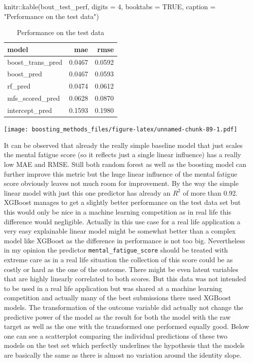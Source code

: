\documentclass[
]{book}
\newenvironment{Shaded}{\begin{snugshade}}{\end{snugshade}}
\newcommand{\AttributeTok}[1]{\textcolor[rgb]{0.77,0.63,0.00}{#1}}
\newcommand{\ConstantTok}[1]{\textcolor[rgb]{0.00,0.00,0.00}{#1}}
\newcommand{\DecValTok}[1]{\textcolor[rgb]{0.00,0.00,0.81}{#1}}
\newcommand{\FunctionTok}[1]{\textcolor[rgb]{0.00,0.00,0.00}{#1}}
\newcommand{\NormalTok}[1]{#1}
\newcommand{\SpecialCharTok}[1]{\textcolor[rgb]{0.00,0.00,0.00}{#1}}
\newcommand{\StringTok}[1]{\textcolor[rgb]{0.31,0.60,0.02}{#1}}
\begin{document}
\begin{Shaded}
\begin{Highlighting}[]
\NormalTok{knitr}\SpecialCharTok{::}\FunctionTok{kable}\NormalTok{(bout\_test\_perf, }\AttributeTok{digits =} \DecValTok{4}\NormalTok{,}
             \AttributeTok{booktabs =} \ConstantTok{TRUE}\NormalTok{,}
             \AttributeTok{caption =} \StringTok{"Performance on the test data"}\NormalTok{)}
\end{Highlighting}
\end{Shaded}

\begin{table}

\caption{\label{tab:perfBurn}Performance on the test data}
\centering
\begin{tabular}[t]{lrr}
\toprule
model & mae & rmse\\
\midrule
boost\_trans\_pred & 0.0467 & 0.0592\\
boost\_pred & 0.0467 & 0.0593\\
rf\_pred & 0.0474 & 0.0612\\
mfs\_scored\_pred & 0.0628 & 0.0870\\
intercept\_pred & 0.1593 & 0.1980\\
\bottomrule
\end{tabular}
\end{table}

\texttt{[image: boosting\_methods\_files/figure-latex/unnamed-chunk-89-1.pdf]}

It can be observed that already the really simple baseline model that just scales the mental fatigue score (so it reflects just a single linear influence) has a really low MAE and RMSE. Still both random forest as well as the boosting model can further improve this metric but the huge linear influence of the mental fatigue score obviously leaves not much room for improvement. By the way the simple linear model with just this one predictor has already an \(R^2\) of more than 0.92. XGBoost manages to get a slightly better performance on the test data set but this would only be nice in a machine learning competition as in real life this difference would negligible. Actually in this use case for a real life application a very easy explainable linear model might be somewhat better than a complex model like XGBoost as the difference in performance is not too big. Nevertheless in my opinion the predictor \texttt{mental\_fatigue\_score} should be treated with extreme care as in a real life situation the collection of this score could be as costly or hard as the one of the outcome. There might be even latent variables that are highly linearly correlated to both scores. But this data was not intended to be used in a real life application but was shared at a machine learning competition and actually many of the best submissions there used XGBoost models. The transformation of the outcome variable did actually not change the predictive power of the model as the result for both the model with the raw target as well as the one with the transformed one performed equally good. Below one can see a scatterplot comparing the individual predictions of these two models on the test set which perfectly underlines the hypothesis that the models are basically the same as there is almost no variation around the identity slope.
\end{document}
